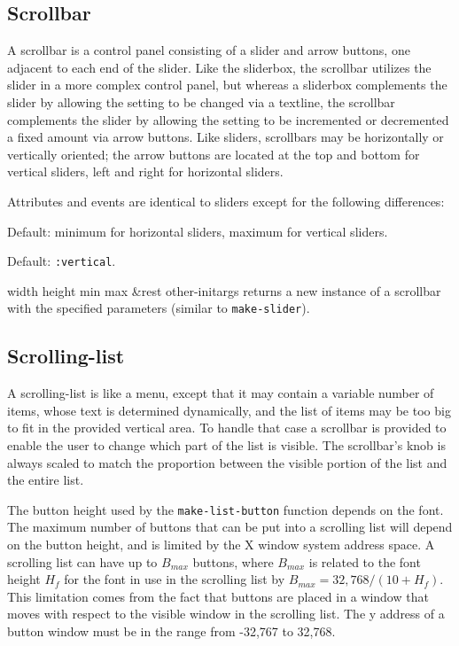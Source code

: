 \documentclass[twoside,openright,11pt]{report}
\newcommand{\tp}[1]{\texttt{#1}}
\begin{document}
\subsection{Scrollbar}

A scrollbar is a control panel consisting of a slider
and arrow buttons, one adjacent to each end of the slider.  Like the
sliderbox, the scrollbar utilizes the slider in a more complex control
panel, but whereas a sliderbox complements the slider by allowing the
setting to be changed via a textline, the scrollbar complements the
slider by allowing the setting to be incremented or decremented a
fixed amount via arrow buttons.  Like sliders, scrollbars may be
horizontally or vertically oriented; the arrow buttons are located at
the top and bottom for vertical sliders, left and right for horizontal
sliders.

Attributes and events are identical to sliders except for the
following differences:

{Default: minimum for horizontal sliders, maximum for vertical
sliders.}

{Default: \tp{:vertical}.}


{width height min max \&rest other-initargs} 
{returns a new instance of a scrollbar with the specified parameters
(similar to \tp{make-slider}).}

\subsection{Scrolling-list} \label{sec:scrolling-list}

A scrolling-list is like a menu, except that it
may contain a variable number of items, whose text is determined
dynamically, and the list of items may be too big to fit in the
provided vertical area.  To handle that case a scrollbar is provided
to enable the user to change which part of the list is visible.  The
scrollbar's knob is always scaled to match the proportion between the
visible portion of the list and the entire list.

The button height used by the \tp{make-list-button} function
depends on the font.  The maximum number of buttons that can be put
into a scrolling list will depend on the button height, and is limited
by the X window system address space.  A scrolling list can have up to
$B_{max}$ buttons, where $B_{max}$ is related to the font height $H_f$
for the font in use in the scrolling list by $B_{max} = 32,768 / (10 +
H_f)$.  This limitation comes from the fact that buttons are placed in
a window that moves with respect to the visible window in the
scrolling list.  The y address of a button window must be in the range
from -32,767 to 32,768.
\end{document}
